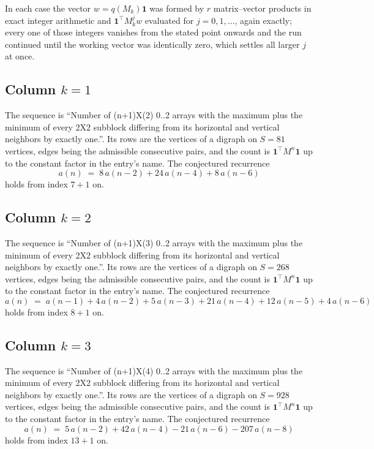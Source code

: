 \documentclass[11pt,a4paper]{article}
\theoremstyle{plain}
\theoremstyle{definition}
\begin{document}
In each case the vector $w=q(M_k)\mathbf{1}$ was formed by $r$ matrix--vector products in
exact integer arithmetic and $\mathbf{1}^{\!\top}M_k^{j}w$ evaluated for $j=0,1,\dots$,
again exactly; every one of those integers vanishes from the stated point onwards and the run
continued until the working vector was identically zero, which settles all larger $j$ at once.

\subsection*{Column $k$$=1$}
The sequence is ``Number of (n+1)X(2) 0..2 arrays with the maximum plus the minimum of every 2X2 subblock differing from its horizontal and vertical neighbors by exactly one.''. Its rows are the vertices of a digraph on
$S=81$ vertices, edges being the admissible consecutive pairs, and the count is
$\mathbf{1}^{\!\top}M^{n}\mathbf{1}$ up to the constant factor in the entry's name.
The conjectured recurrence
\[
a(n)\;=\;8\,a(n-2) + 24\,a(n-4) + 8\,a(n-6)
\]
holds from index $7+1$ on.

\subsection*{Column $k$$=2$}
The sequence is ``Number of (n+1)X(3) 0..2 arrays with the maximum plus the minimum of every 2X2 subblock differing from its horizontal and vertical neighbors by exactly one.''. Its rows are the vertices of a digraph on
$S=268$ vertices, edges being the admissible consecutive pairs, and the count is
$\mathbf{1}^{\!\top}M^{n}\mathbf{1}$ up to the constant factor in the entry's name.
The conjectured recurrence
\[
a(n)\;=\;a(n-1) + 4\,a(n-2) + 5\,a(n-3) + 21\,a(n-4) + 12\,a(n-5) + 4\,a(n-6)
\]
holds from index $8+1$ on.

\subsection*{Column $k$$=3$}
The sequence is ``Number of (n+1)X(4) 0..2 arrays with the maximum plus the minimum of every 2X2 subblock differing from its horizontal and vertical neighbors by exactly one.''. Its rows are the vertices of a digraph on
$S=928$ vertices, edges being the admissible consecutive pairs, and the count is
$\mathbf{1}^{\!\top}M^{n}\mathbf{1}$ up to the constant factor in the entry's name.
The conjectured recurrence
\[
a(n)\;=\;5\,a(n-2) + 42\,a(n-4) - 21\,a(n-6) - 207\,a(n-8)
\]
holds from index $13+1$ on.
\end{document}
